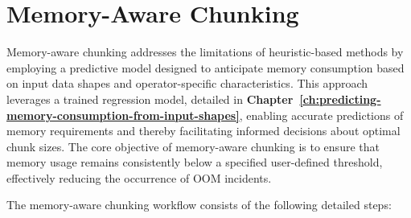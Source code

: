 \section{Memory-Aware Chunking}
\label{sec:idp-memory-aware-chunking}

Memory-aware chunking addresses the limitations of heuristic-based methods by employing a predictive model designed to anticipate memory consumption based on input data shapes and operator-specific characteristics.
This approach leverages a trained regression model, detailed in \textbf{Chapter~\ref{ch:predicting-memory-consumption-from-input-shapes}}, enabling accurate predictions of memory requirements and thereby facilitating informed decisions about optimal chunk sizes.
The core objective of memory-aware chunking is to ensure that memory usage remains consistently below a specified user-defined threshold, effectively reducing the occurrence of \ac{OOM} incidents.

The memory-aware chunking workflow consists of the following detailed steps:


